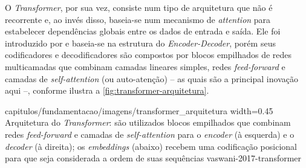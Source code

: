 



O \textit{Transformer}, por sua vez, consiste num tipo de arquitetura que não é recorrente e, ao invés disso, baseia-se num mecanismo de \textit{attention} para estabelecer dependências globais entre os dados de entrada e saída.
Ele foi introduzido por  e baseia-se na estrutura do \textit{Encoder-Decoder}, porém seus codificadores e decodificadores são compostos por blocos empilhados de redes multicamadas que combinam camadas lineares simples, redes \textit{feed-forward} e camadas de \textit{self-attention} (ou auto-atenção) -- as quais são a principal inovação aqui --, conforme ilustra a \autoref{fig:transformer-arquitetura}.

{capitulos/fundamentacao/imagens/transformer_arquitetura}
{width=0.45\textwidth}
{Arquitetura do \textit{Transformer}: são utilizados blocos empilhados que combinam redes \textit{feed-forward} e camadas de \textit{self-attention} para o \textit{encoder} (à esquerda) e o \textit{decoder} (à direita); os \textit{embeddings} (abaixo) recebem uma codificação posicional para que seja considerada a ordem de suas sequências}
{vaswani-2017-transformer}




